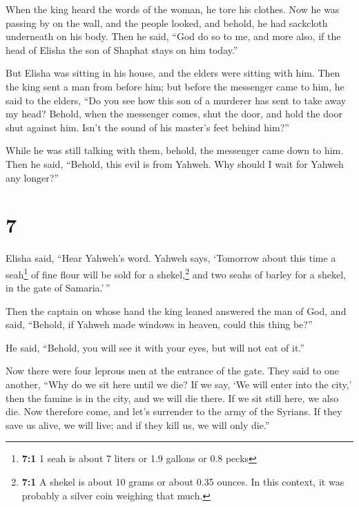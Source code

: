  When the king heard the words of the woman, he tore his
clothes. Now he was passing by on the wall, and the people looked, and
behold, he had sackcloth underneath on his body.  Then he
said, ``God do so to me, and more also, if the head of Elisha the son of
Shaphat stays on him today.''

 But Elisha was sitting in his house, and the elders were
sitting with him. Then the king sent a man from before him; but before
the messenger came to him, he said to the elders, ``Do you see how this
son of a murderer has sent to take away my head? Behold, when the
messenger comes, shut the door, and hold the door shut against him.
Isn't the sound of his master's feet behind him?''

 While he was still talking with them, behold, the
messenger came down to him. Then he said, ``Behold, this evil is from
Yahweh. Why should I wait for Yahweh any longer?''

\hypertarget{section-6}{%
\section{7}\label{section-6}}

 Elisha said, ``Hear Yahweh's word. Yahweh says, `Tomorrow
about this time a seah\footnote{\textbf{7:1} 1 seah is about 7 liters or
  1.9 gallons or 0.8 pecks} of fine flour will be sold for a
shekel,\footnote{\textbf{7:1} A shekel is about 10 grams or about 0.35
  ounces. In this context, it was probably a silver coin weighing that
  much.} and two seahs of barley for a shekel, in the gate of
Samaria.'\,''

 Then the captain on whose hand the king leaned answered
the man of God, and said, ``Behold, if Yahweh made windows in heaven,
could this thing be?''

He said, ``Behold, you will see it with your eyes, but will not eat of
it.''

 Now there were four leprous men at the entrance of the
gate. They said to one another, ``Why do we sit here until we die?
 If we say, `We will enter into the city,' then the famine
is in the city, and we will die there. If we sit still here, we also
die. Now therefore come, and let's surrender to the army of the Syrians.
If they save us alive, we will live; and if they kill us, we will only
die.''

